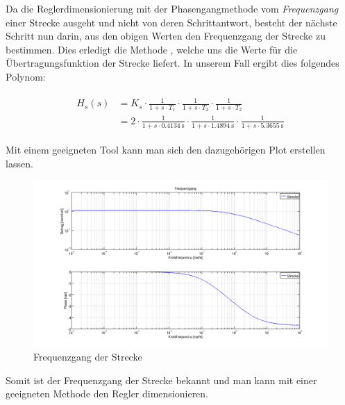 Da die Reglerdimensionierung mit der Phasengangmethode vom \emph{Frequenzgang}
einer   Strecke  ausgeht   und   nicht  von   deren  Schrittantwort,   besteht
der   n\"achste   Schritt    nun   darin,   aus   den    obigen   Werten   den
Frequenzgang   der   Strecke   zu   bestimmen. Dies   erledigt   die   Methode
\footnotemark[3],    welche   uns    die    Werte   f\"ur    die
\"Ubertragungsfunktion  der  Strecke  liefert.
  In unserem  Fall ergibt
dies folgendes Polynom:


\begin{gather} \label{eq:transfer:plant}
    \begin{split}
        H_s (s) & = K_s
                  \cdot \frac{1}{1 + s \cdot T_1}
                  \cdot \frac{1}{1 + s \cdot T_2}
                  \cdot \frac{1}{1 + s \cdot T_2}                     \\
                & = 2
                  \cdot \frac{1}{1 + s \cdot \SI{0.4134}{\second}}
                  \cdot \frac{1}{1 + s \cdot \SI{1.4894}{\second}}
                  \cdot \frac{1}{1 + s \cdot \SI{5.3655}{\second}}
    \end{split}
\end{gather}

Mit einem  geeigneten Tool  kann man sich  den dazugeh\"origen  Plot erstellen
lassen.

\begin{figure}[h! width=\pagewidth]
    \includegraphics[width=\textwidth]{images/streckeFrequenzgang.png}
    \caption{%
        Frequenzgang der Strecke%
    }
    \label{fig:plant_freq}
\end{figure}

Somit  ist  der Frequenzgang  der  Strecke  bekannt  und  man kann  mit  einer
geeigneten Methode den Regler dimensionieren.
